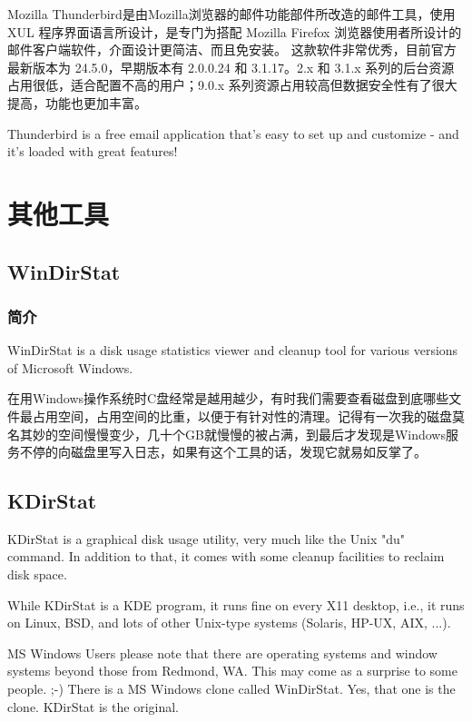 \documentclass[paper=a4,fontsize=11pt]{article}
\begin{document}
	Mozilla Thunderbird是由Mozilla浏览器的邮件功能部件所改造的邮件工具，使用 XUL 程序界面语言所设计，是专门为搭配 Mozilla Firefox 浏览器使用者所设计的邮件客户端软件，介面设计更简洁、而且免安装。 这款软件非常优秀，目前官方最新版本为 24.5.0，早期版本有 2.0.0.24 和 3.1.17。2.x 和 3.1.x 系列的后台资源占用很低，适合配置不高的用户；9.0.x 系列资源占用较高但数据安全性有了很大提高，功能也更加丰富。
	
	Thunderbird is a free email application that's easy to set up and customize - and it's loaded with great features!
	
	\section{其他工具}
	
	\subsection{WinDirStat}
	
	\subsubsection{简介}
	WinDirStat is a disk usage statistics viewer and cleanup tool for various versions of Microsoft Windows.
	
	在用Windows操作系统时C盘经常是越用越少，有时我们需要查看磁盘到底哪些文件最占用空间，占用空间的比重，以便于有针对性的清理。记得有一次我的磁盘莫名其妙的空间慢慢变少，几十个GB就慢慢的被占满，到最后才发现是Windows服务不停的向磁盘里写入日志，如果有这个工具的话，发现它就易如反掌了。
		
	\subsection{KDirStat}
	KDirStat is a graphical disk usage utility, very much like the Unix "du" command. In addition to that, it comes with some cleanup facilities to reclaim disk space.
	
	While KDirStat is a KDE program, it runs fine on every X11 desktop, i.e., it runs on Linux, BSD, and lots of other Unix-type systems (Solaris, HP-UX, AIX, ...).
	
	MS Windows Users please note that there are operating systems and window systems beyond those from Redmond, WA. This may come as a surprise to some people. ;-) There is a MS Windows clone called WinDirStat. Yes, that one is the clone. KDirStat is the original.
		
	
	
\end{document}
